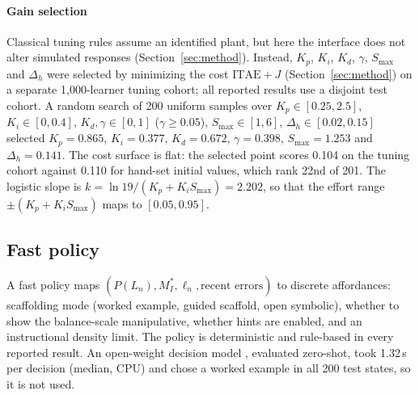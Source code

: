\documentclass[conference]{IEEEtran}
\begin{document}
\paragraph*{Gain selection}
Classical tuning rules \cite{ziegler1942optimum,skogestad2003simple}
assume an identified plant, but here the interface does not alter simulated
responses (Section~\ref{sec:method}). Instead, $K_p$, $K_i$, $K_d$, $\gamma$,
$S_{\max}$ and $\Delta_h$ were selected by minimizing the cost $\mathrm{ITAE}+J$
(Section~\ref{sec:method}) \cite{graham1953itae} on a separate 1,000-learner
tuning cohort; all reported results use a disjoint test cohort. A random search
of 200 uniform samples over $K_p\in[0.25,2.5]$, $K_i\in[0,0.4]$, $K_d,\gamma\in
[0,1]$ ($\gamma\ge 0.05$), $S_{\max}\in[1,6]$, $\Delta_h\in[0.02,0.15]$ selected
$K_p=0.865$, $K_i=0.377$, $K_d=0.672$, $\gamma=0.398$, $S_{\max}=1.253$ and
$\Delta_h=0.141$. The cost surface is flat: the selected point scores 0.104
on the tuning cohort against 0.110 for hand-set initial values, which rank
22nd of 201. The logistic slope is $k=\ln 19/(K_p+K_iS_{\max})=2.202$, so
that the effort range $\pm(K_p+K_iS_{\max})$ maps to $[0.05,0.95]$.

\subsection{Fast policy}
A fast policy maps $(P(L_n), M_I^*, \ell_n, \text{recent errors})$ to discrete
affordances: scaffolding mode (worked example, guided scaffold, open
symbolic), whether to show the balance-scale manipulative, whether hints are
enabled, and an instructional density limit. The policy is deterministic
and rule-based in every reported result. An open-weight decision model
\cite{laya2026}, evaluated zero-shot, took 1.32\,s per decision (median, CPU)
and chose a worked example in all 200 test states, so it is not used.
\end{document}

